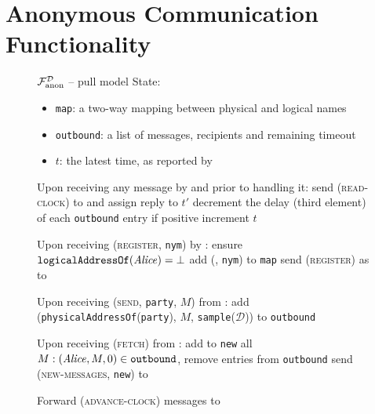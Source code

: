 \section{Anonymous Communication Functionality}
  \label{sec:fanon}
  \begin{figure}[H]
    \begin{systembox}{$\mathcal{F}_{\mathrm{anon}}^{\mathcal{D}}$ -- pull model} 
      State:
      \begin{itemize}
        \item \texttt{map}: a two-way mapping between physical and logical names
        \item \texttt{outbound}: a list of messages, recipients and remaining
        timeout
        \item $t$: the latest time, as reported by \gFclock
      \end{itemize}
      \begin{algorithmic}[1]
        \State Upon receiving any message by \alice and prior to handling it:
        \Indent
          \State send (\textsc{read-clock}) to \gFclock and assign reply to $t'$
            \State decrement the delay (third element) of each \texttt{outbound}
            entry if positive
            \State increment $t$
          \EndIf
        \EndIndent
        \Statex

        \State Upon receiving (\textsc{register}, \texttt{nym}) by \alice:
        \Indent
          \State ensure $\mathtt{logicalAddressOf}(\mathit{Alice}) = \bot$
          \State add (\alice, \texttt{nym}) to \texttt{map}
          \State send (\textsc{register}) as \alice to \gFclock
        \EndIndent
        \Statex

        \State Upon receiving (\textsc{send}, \texttt{party}, $M$) from \alice:
        \Indent
          \State add (\texttt{physicalAddressOf}(\texttt{party}), $M$,
          \texttt{sample}($\mathcal{D}$)) to \texttt{outbound} 
        \EndIndent
        \Statex

        \State Upon receiving (\textsc{fetch}) from \alice:
        \Indent
          \State add to \texttt{new} all $M: (\mathit{Alice}, M, 0) \in
          \mathtt{outbound}$, remove entries from \texttt{outbound}
          \State send (\textsc{new-messages}, \texttt{new}) to \alice
        \EndIndent
        \Statex

        \State Forward (\textsc{advance-clock}) messages to \gFclock
      \end{algorithmic}
    \end{systembox}
    \caption{}
    \label{alg:fanon:pull}
  \end{figure}

